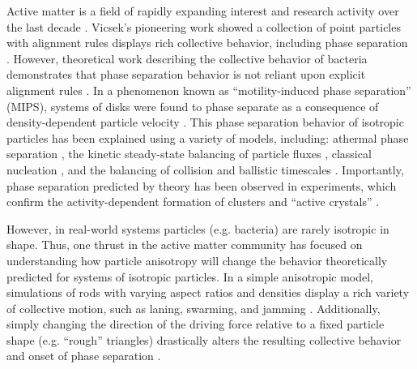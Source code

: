 

Active matter is a field of rapidly expanding interest and research activity over the last decade \cite{Ramaswamy_2010_AnnRevConMatPhys,Marchetti_2013_RevModPhys,Bechinger_2016_RevModPhys,Marchetti_2016_CurrentOpinionColloidInterfaceScience}.
Vicsek's pioneering work showed a collection of point particles with alignment rules displays rich collective behavior, including phase separation \cite{Vicsek_1995_PRL}.
However, theoretical work describing the collective behavior of bacteria demonstrates that phase separation behavior is not reliant upon explicit alignment rules \cite{Cates_2010_PNAS}.
In a phenomenon known as ``motility-induced phase separation'' (MIPS), systems of disks were found to phase separate as a consequence of density-dependent particle velocity \cite{Cates_2013_EPL}.
This phase separation behavior of isotropic particles has been explained using a variety of models, including: athermal phase separation \cite{Fily_2012_PRL}, the kinetic steady-state balancing of particle fluxes \cite{Redner_2013_PRE, Redner_2013_PRL}, classical nucleation \cite{Richard_2016_SoftMatter,Redner_2016_PRL}, and the balancing of collision and ballistic timescales \cite{Bruss_2018_PRE}.
Importantly, phase separation predicted by theory has been observed in experiments, which confirm the activity-dependent formation of clusters and ``active crystals'' \cite{Palacci_2013_Science,Petroff_2015_PRL,Briand_2016_PRL}.

However, in real-world systems particles (e.g. bacteria) are rarely isotropic in shape.
Thus, one thrust in the active matter community has focused on understanding how particle anisotropy will change the behavior theoretically predicted for systems of isotropic particles.
In a simple anisotropic model, simulations of rods with varying aspect ratios and densities display a rich variety of collective motion, such as laning, swarming, and jamming \cite{Wensink_2012_JPhysConMat,Wensink_2012_PNAS,Yang_2010_PRE}.
Additionally, simply changing the direction of the driving force relative to a fixed particle shape (e.g. ``rough'' triangles) drastically alters the resulting collective behavior and onset of phase separation \cite{Wensink_2014_PRE,Ilse_2016_JChemPhys}.

